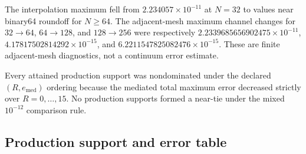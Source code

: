 \documentclass[11pt]{article}
\begin{document}
The interpolation maximum fell from $2.234057\times10^{-11}$ at $N=32$ to values near
binary64 roundoff for $N\ge64$.  The adjacent-mesh maximum channel changes for
$32\rightarrow64$, $64\rightarrow128$, and $128\rightarrow256$ were respectively
$2.2339685656902475\times10^{-11}$, $4.17817502814292\times10^{-15}$, and
$6.2211547825082476\times10^{-15}$.  These are finite adjacent-mesh diagnostics, not a
continuum error estimate.

Every attained production support was nondominated under the declared
$(R,e_{\mathrm{med}})$ ordering because the mediated total maximum error decreased
strictly over $R=0,\ldots,15$.  No production supports formed a near-tie under the
mixed $10^{-12}$ comparison rule.

\subsection{Production support and error table}
\end{document}
